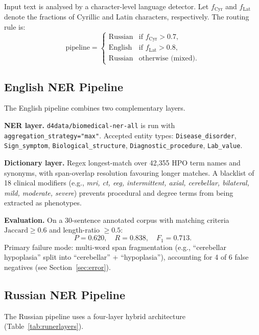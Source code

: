 \documentclass[11pt,a4paper]{article}
\begin{document}
Input text is analysed by a character-level language detector.  Let
$f_\mathrm{Cyr}$ and $f_\mathrm{Lat}$ denote the fractions of Cyrillic and
Latin characters, respectively.  The routing rule is:
\[
  \text{pipeline} =
  \begin{cases}
    \text{Russian} & \text{if } f_\mathrm{Cyr} > 0.7, \\
    \text{English} & \text{if } f_\mathrm{Lat} > 0.8, \\
    \text{Russian} & \text{otherwise (mixed)}.
  \end{cases}
\]

\subsection{English NER Pipeline}

The English pipeline combines two complementary layers.

\textbf{NER layer.}  \texttt{d4data/biomedical-ner-all} is run with
\texttt{aggregation\_strategy="max"}.  Accepted entity types:
\texttt{Disease\_disorder}, \texttt{Sign\_symptom},
\texttt{Biological\_structure}, \texttt{Diagnostic\_procedure},
\texttt{Lab\_value}.

\textbf{Dictionary layer.}  Regex longest-match over 42{,}355 HPO term names
and synonyms, with span-overlap resolution favouring longer matches.  A
blacklist of 18 clinical modifiers (e.g., \textit{mri, ct, eeg, intermittent,
axial, cerebellar, bilateral, mild, moderate, severe}) prevents procedural and
degree terms from being extracted as phenotypes.

\textbf{Evaluation.}  On a 30-sentence annotated corpus with matching criteria
$\mathrm{Jaccard} \geq 0.6$ and length-ratio $\geq 0.5$:
\[
  P = 0.620, \quad R = 0.838, \quad F_1 = 0.713.
\]
Primary failure mode: multi-word span fragmentation (e.g., ``cerebellar
hypoplasia'' split into ``cerebellar'' + ``hypoplasia''), accounting for 4 of 6
false negatives (see Section~\ref{sec:error}).

\subsection{Russian NER Pipeline}

The Russian pipeline uses a four-layer hybrid architecture (Table~\ref{tab:runerlayers}).
\end{document}
